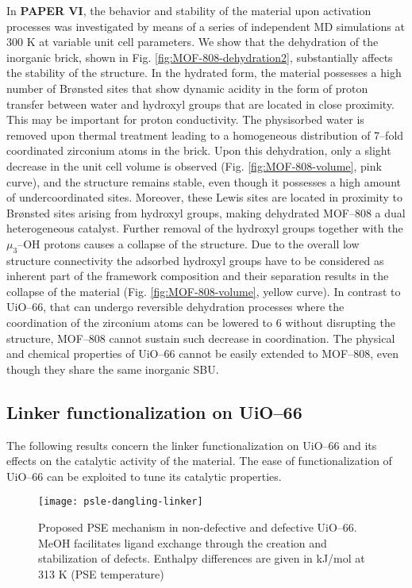 In \textbf{PAPER VI}, the behavior and stability of the material upon activation processes was investigated by means of a series of independent MD simulations at 300 K at variable unit cell parameters. We show that the dehydration of the inorganic brick, shown in Fig. \ref{fig:MOF-808-dehydration2}, substantially affects the stability of the structure. In the hydrated form, the material possesses a high number of Br\o{}nsted sites that show dynamic acidity in the form of proton transfer between water and hydroxyl groups that are located in close proximity. This may be important for proton conductivity. The physisorbed water is removed upon thermal treatment leading to a homogeneous distribution of 7--fold coordinated zirconium atoms in the brick. Upon this dehydration, only a slight decrease in the unit cell volume is observed (Fig. \ref{fig:MOF-808-volume}, pink curve), and the structure remains stable, even though it possesses a high amount of undercoordinated sites. Moreover, these Lewis sites are located in proximity to Br\o{}nsted sites arising from hydroxyl groups, making dehydrated MOF--808 a dual heterogeneous catalyst. Further removal of the hydroxyl groups together with the $\mu_3$--OH protons causes a collapse of the structure. Due to the overall low structure connectivity the adsorbed hydroxyl groups have to be considered as inherent part of the framework composition and their separation results in the collapse of the material (Fig. \ref{fig:MOF-808-volume}, yellow curve). In contrast to UiO--66, that can undergo reversible dehydration processes where the coordination of the zirconium atoms can be lowered to 6 without disrupting the structure, MOF--808 cannot sustain such decrease in coordination. The physical and chemical properties of UiO--66 cannot be easily extended to MOF--808, even though they share the same inorganic SBU. 

\subsection*{Linker functionalization on UiO--66}
The following results concern the linker functionalization on UiO--66 and its effects on the catalytic activity of the material. The ease of functionalization of UiO--66 can be exploited to tune its catalytic properties. 
\begin{figure}[!htbp]
	\centering
	\texttt{[image: psle-dangling-linker]}
	\caption{Proposed PSE mechanism in non-defective and defective UiO--66. MeOH facilitates ligand exchange through the creation and stabilization of defects. Enthalpy differences are given in kJ/mol at 313 K (PSE temperature)}
	\label{fig:psle-dangling-linker}
\end{figure}
